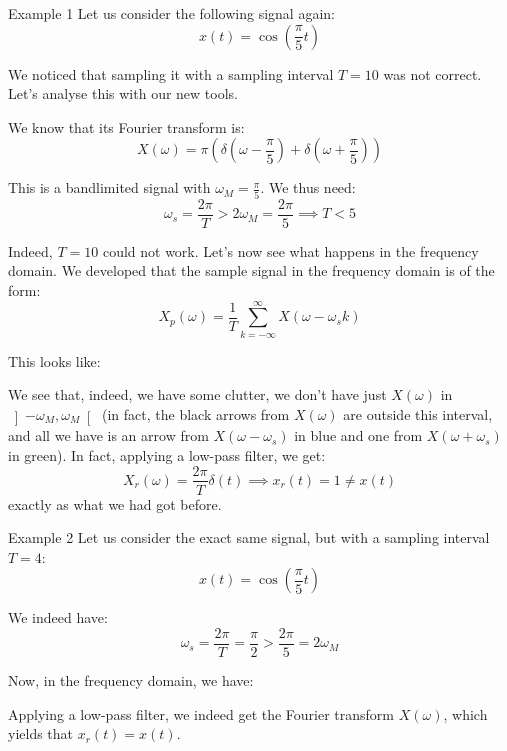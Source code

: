 \documentclass[a4paper]{article}
\begin{document}
\begin{parag}{Example 1}
    Let us consider the following signal again: 
    \[x\left(t\right) = \cos\left(\frac{\pi}{5}t\right)\]
    
    We noticed that sampling it with a sampling interval $T = 10$ was not correct. Let's analyse this with our new tools.

    We know that its Fourier transform is: 
    \[X\left(\omega\right) = \pi\left(\delta\left(\omega - \frac{\pi}{5}\right) + \delta\left(\omega + \frac{\pi}{5}\right)\right)\]
    
    This is a bandlimited signal with $\omega_M = \frac{\pi}{5}$. We thus need: 
    \[\omega_s = \frac{2\pi}{T} > 2 \omega_M = \frac{2\pi}{5} \implies T < 5\]
    
    Indeed, $T = 10$ could not work. Let's now see what happens in the frequency domain. We developed that the sample signal in the frequency domain is of the form: 
    \[X_p\left(\omega\right) = \frac{1}{T} \sum_{k=-\infty}^{\infty} X\left(\omega - \omega_s k\right)\]
    
    This looks like:

    We see that, indeed, we have some clutter, we don't have just $X\left(\omega\right)$ in $\left]-\omega_M, \omega_M\right[ $ (in fact, the black arrows from $X\left(\omega\right)$ are outside this interval, and all we have is an arrow from $X\left(\omega - \omega_s\right)$ in blue and one from $X\left(\omega + \omega_s\right)$ in green). In fact, applying a low-pass filter, we get: 
    \[X_r\left(\omega\right) = \frac{2\pi}{T} \delta\left(t\right) \implies x_r\left(t\right) = 1 \neq x\left(t\right)\]
    exactly as what we had got before.
\end{parag}

\begin{parag}{Example 2}
    Let us consider the exact same signal, but with a sampling interval $T =4$: 
    \[x\left(t\right) = \cos\left(\frac{\pi}{5}t\right)\]
    
    We indeed have: 
    \[\omega_s = \frac{2\pi}{T} = \frac{\pi}{2} > \frac{2\pi}{5} = 2 \omega_M\]
    
    Now, in the frequency domain, we have:

    Applying a low-pass filter, we indeed get the Fourier transform $X\left(\omega\right)$, which yields that $x_r\left(t\right) = x\left(t\right)$.    
\end{parag}
\end{document}
